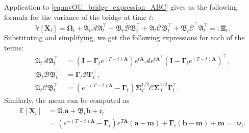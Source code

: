 \documentclass{article}
\newcommand{\E}{\mathbb{E}}
\newcommand{\V}{\mathbb{V}}
\newcommand{\Ac}{\mathcal{A}}
\newcommand{\Bc}{\mathcal{B}}
\newcommand{\Cc}{\mathcal{C}}
\newcommand{\bmathfrak}[1]{\bm{\mathfrak{#1}}}
\theoremstyle{newstyle}
\begin{document}
Application to \eqref{eq:mvOU_bridge_expression_ABC} gives us the following formula for the variance of the bridge at time $t$:
\begin{equation}
  \V[\bm{X}_t] = \bm{\Omega}_t + \bmathfrak{A}_t \bm{\overline{\Ac}} \bmathfrak{A}_t^\top + \bmathfrak{B}_t \bm{\overline{\Bc}} \bmathfrak{B}_t^\top + \bmathfrak{A}_t \bm{\overline{\Cc}} \bmathfrak{B}_t^\top + \bmathfrak{B}_t \bm{\overline{\Cc}}^\top \bmathfrak{A}_t^\top =: \bm{\Xi}_{t}. 
\end{equation}
Substituting and simplifying, we get the following expressions for each of the terms:
\begin{align}
  \bmathfrak{A}_t\bm{\overline{\Ac}}\bmathfrak{A}_t^\top &= (\bm{I} - \bm{\Gamma}_t e^{(T-t)\bm{A}}) e^{t\bm{A}} \bm{\Ac} e^{t\bm{A}^\top} (\bm{I} - \bm{\Gamma}_t e^{(T-t)\bm{A}})^\top , \\
  \bmathfrak{B}_t\bm{\overline{\Bc}}\bmathfrak{B}_t^\top &= \bm{\Gamma}_t \bm{\Bc} \bm{\Gamma}_t^\top, \\
  \bmathfrak{A}_t\bm{\overline{\Cc}}\bmathfrak{B}_t^\top &= (e^{-(T-t)\bm{A}} - \bm{\Gamma}_t) \bm{\Sigma}_T^{1/2} \bm{\overline{\Cc}} \bm{\Sigma}_T^{1/2} \bm{\Gamma}_t^\top. 
\end{align}
Similarly, the mean can be computed as
\begin{align}
  \E[\bm{X}_t] &= \bmathfrak{A}_t \overline{\bm{a}} + \bmathfrak{B}_t \overline{\bm{b}} + \bmathfrak{c}_t \\
               &= \left(e^{-(T-t)\bm{A}} - \bm{\Gamma}_t \right) e^{T\bm{A}} (\bm{a} - \bm{m}) + \bm{\Gamma}_t (\bm{b} - \bm{m}) + \bm{m} =: \bm{\nu}_t. 
\end{align}
\end{document}
